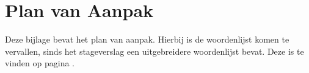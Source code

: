 \chapter{Plan van Aanpak}

Deze bijlage bevat het plan van aanpak. Hierbij is de woordenlijst komen te vervallen, sinds het stageverslag een uitgebreidere woordenlijst bevat. Deze is te vinden op pagina \pageref{woordenlijst}.



\newpage















